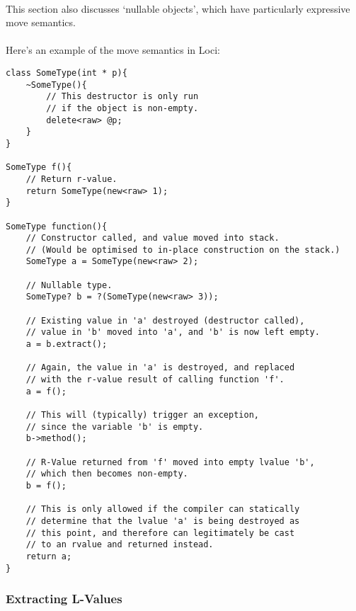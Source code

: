 \documentclass[12pt,twoside,notitlepage]{report}
\begin{document}
\paragraph{}
This section also discusses `nullable objects', which have particularly expressive move semantics.

\paragraph{}
Here's an example of the move semantics in Loci:

\begin{lstlisting}
class SomeType(int * p){
	~SomeType(){
		// This destructor is only run
		// if the object is non-empty.
		delete<raw> @p;
	}
}

SomeType f(){
	// Return r-value.
	return SomeType(new<raw> 1);
}

SomeType function(){
	// Constructor called, and value moved into stack.
	// (Would be optimised to in-place construction on the stack.)
	SomeType a = SomeType(new<raw> 2);
	
	// Nullable type.
	SomeType? b = ?(SomeType(new<raw> 3));
	
	// Existing value in 'a' destroyed (destructor called),
	// value in 'b' moved into 'a', and 'b' is now left empty.
	a = b.extract();
	
	// Again, the value in 'a' is destroyed, and replaced
	// with the r-value result of calling function 'f'.
	a = f();
	
	// This will (typically) trigger an exception,
	// since the variable 'b' is empty.
	b->method();
	
	// R-Value returned from 'f' moved into empty lvalue 'b',
	// which then becomes non-empty.
	b = f();
	
	// This is only allowed if the compiler can statically
	// determine that the lvalue 'a' is being destroyed as
	// this point, and therefore can legitimately be cast
	// to an rvalue and returned instead.
	return a;
}
\end{lstlisting}


\subsubsection{Extracting L-Values}

\paragraph{}
\end{document}
